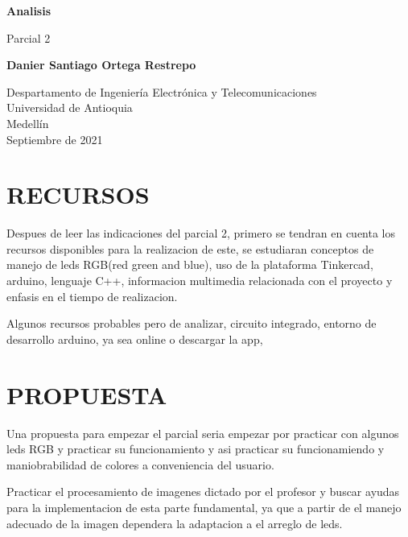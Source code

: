 \documentclass{article}
\begin{document}
\begin{titlepage}
    \begin{center}
        \vspace*{1cm}
            
        \Huge
        \textbf{Analisis}
            
        \vspace{0.5cm}
        \LARGE
        Parcial 2
            
        \vspace{1.5cm}
            
        \textbf{Danier Santiago Ortega Restrepo}
            
        \vfill
            
        \vspace{0.8cm}
            
        \Large
        Despartamento de Ingeniería Electrónica y Telecomunicaciones\\
        Universidad de Antioquia\\
        Medellín\\
       Septiembre de 2021
            
    \end{center}
\end{titlepage}

\newpage
\tableofcontents
\section{RECURSOS}
Despues de leer las indicaciones del parcial 2, primero se tendran en cuenta los recursos disponibles para la realizacion de este, se estudiaran conceptos de manejo de leds RGB(red green and blue), uso de la plataforma Tinkercad, arduino, lenguaje C++, informacion multimedia relacionada con el proyecto y enfasis en el tiempo de realizacion.

Algunos recursos probables pero de analizar, circuito integrado, entorno de desarrollo arduino, ya sea online o descargar la app, 

\section{PROPUESTA}
Una propuesta para empezar el parcial seria empezar por practicar con algunos leds RGB y practicar su funcionamiento y asi practicar su funcionamiendo y maniobrabilidad de colores a conveniencia del usuario.

Practicar el procesamiento de imagenes dictado por el profesor y buscar ayudas para la implementacion de esta parte fundamental, ya que a partir de el manejo adecuado de la imagen dependera la adaptacion a el arreglo de leds.
\end{document}
